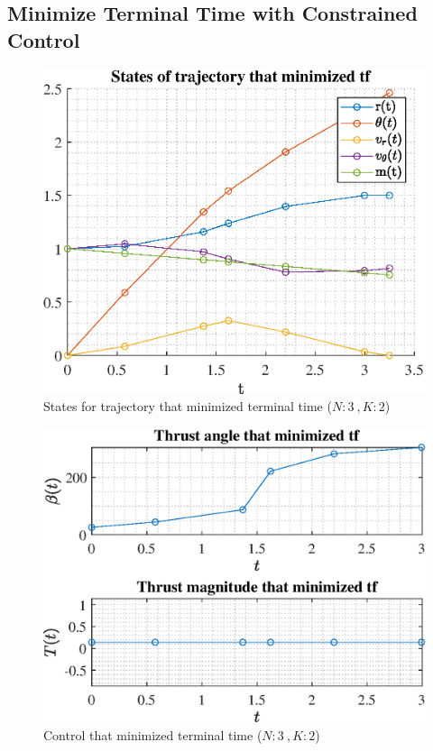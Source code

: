 \documentclass[]{article}
\begin{document}
	\subsection{Minimize Terminal Time with Constrained Control}
	\begin{figure}
		\centering
		\includegraphics[scale=0.75]{states_N3_K2_C3_tf.eps}
		\caption{States for trajectory that minimized terminal time (\(N:3\ , K:2\))}
		\label{fig:states_N3_K2_C3_tf}
	\end{figure}
	\begin{figure}
		\centering
		\includegraphics[scale=0.75]{control_N3_K2_C3_tf.eps}
		\caption{Control that minimized terminal time (\(N:3\ , K:2\))}
		\label{fig:control_N3_K2_C3_tf}
	\end{figure}
\end{document}
